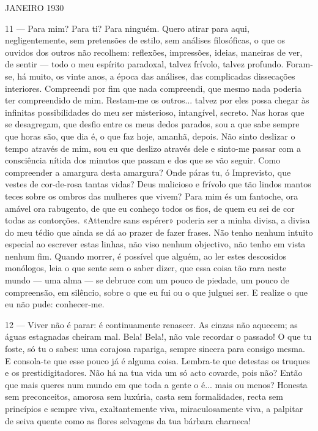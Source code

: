 
JANEIRO 1930

11 — Para mim? Para ti? Para ninguém. Quero atirar
para aqui, negligentemente, sem pretensões de estilo,
sem análises filosóficas, o que os ouvidos dos outros
não recolhem: reflexões, impressões, ideias, maneiras
de ver, de sentir — todo o meu espírito paradoxal,
talvez frívolo, talvez profundo.
Foram-se, há muito, os vinte anos, a época das análises,
das complicadas dissecações interiores. Compreendi por
fim que nada compreendi, que mesmo nada poderia ter
compreendido de mim. Restam-me os outros... talvez
por eles possa chegar às infinitas possibilidades do meu
ser misterioso, intangível, secreto.
Nas horas que se desagregam, que desfio entre os meus
dedos parados, sou a que sabe sempre que horas são,
que dia é, o que faz hoje, amanhã, depois. Não sinto
deslizar o tempo através de mim, sou eu que deslizo
através dele e sinto-me passar com a consciência
nítida dos minutos que passam e dos que se vão
seguir. Como compreender a amargura desta 
amargura? Onde páras tu, ó Imprevisto, que vestes de
cor-de-rosa tantas vidas? Deus malicioso e frívolo que
tão lindos mantos teces sobre os ombros das mulheres
que vivem? Para mim és um fantoche, ora amável
ora rabugento, de que eu conheço todos os fios, de
quem eu sei de cor todas as contorções. «Attendre sans
espérer» poderia ser a minha divisa, a divisa do meu tédio que ainda se dá ao prazer de fazer frases.
Não tenho nenhum intuito especial ao escrever estas
linhas, não viso nenhum objectivo, não tenho em vista
nenhum fim. Quando morrer, é possível que alguém,
ao ler estes descosidos monólogos, leia o que sente
sem o saber dizer, que essa coisa tão rara neste mundo
— uma alma — se debruce com um pouco de piedade,
um pouco de compreensão, em silêncio, sobre o que eu
fui ou o que julguei ser. E realize o que eu não pude: conhecer-me.

12 — Viver não é parar: é continuamente renascer.
As cinzas não aquecem; as águas estagnadas cheiram
mal. Bela! Bela!, não vale recordar o passado! O que
tu foste, só tu o sabes: uma corajosa rapariga, sempre
sincera para consigo mesma.
E consola-te que esse pouco já é alguma coisa. 
Lembra-te que detestas os truques e os prestidigitadores.
Não há na tua vida um só acto covarde, pois não?
Então que mais queres num mundo em que toda a
gente o é... mais ou menos? Honesta sem preconceitos, amorosa sem luxúria, casta sem formalidades,
recta sem princípios e sempre viva, exaltantemente
viva, miraculosamente viva, a palpitar de seiva
quente como as flores selvagens da tua bárbara
charneca!


